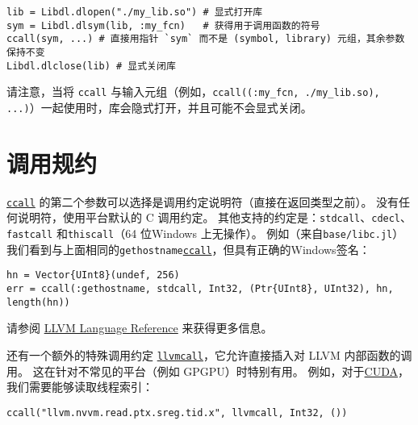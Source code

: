 \begin{verbatim}
lib = Libdl.dlopen("./my_lib.so") # 显式打开库
sym = Libdl.dlsym(lib, :my_fcn)   # 获得用于调用函数的符号
ccall(sym, ...) # 直接用指针 `sym` 而不是 (symbol, library) 元组，其余参数保持不变
Libdl.dlclose(lib) # 显式关闭库
\end{verbatim}



请注意，当将 \texttt{ccall} 与输入元组（例如，\texttt{ccall((:my\_fcn, {\textquotedbl}./my\_lib.so{\textquotedbl}), ...)}）一起使用时，库会隐式打开，并且可能不会显式关闭。



\hypertarget{14242265699396110950}{}


\section{调用规约}



\hyperlink{14245046751182637566}{\texttt{ccall}} 的第二个参数可以选择是调用约定说明符（直接在返回类型之前）。 没有任何说明符，使用平台默认的 C 调用约定。 其他支持的约定是：\texttt{stdcall}、\texttt{cdecl}、\texttt{fastcall} 和\texttt{thiscall}（64 位Windows 上无操作）。 例如（来自\texttt{base/libc.jl}）我们看到与上面相同的\texttt{gethostname}\hyperlink{14245046751182637566}{\texttt{ccall}}，但具有正确的Windows签名：




\begin{verbatim}
hn = Vector{UInt8}(undef, 256)
err = ccall(:gethostname, stdcall, Int32, (Ptr{UInt8}, UInt32), hn, length(hn))
\end{verbatim}



请参阅 \href{http://llvm.org/docs/LangRef.html\#calling-conventions}{LLVM Language Reference} 来获得更多信息。



还有一个额外的特殊调用约定 \hyperlink{12406828992589210838}{\texttt{llvmcall}}，它允许直接插入对 LLVM 内部函数的调用。 这在针对不常见的平台（例如 GPGPU）时特别有用。 例如，对于\href{http://llvm.org/docs/NVPTXUsage.html}{CUDA}，我们需要能够读取线程索引：




\begin{verbatim}
ccall("llvm.nvvm.read.ptx.sreg.tid.x", llvmcall, Int32, ())
\end{verbatim}



